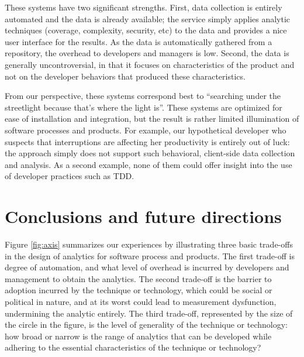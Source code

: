 \documentclass[]{article}
\begin{document}
These systems have two significant strengths.  First, data collection is entirely
automated and the data is already available; the service simply applies analytic
techniques (coverage, complexity, security, etc) to the data and provides a nice user
interface for the results. As the data is automatically gathered from a repository, the
overhead to developers and managers is low. Second, the data is generally
uncontroversial, in that it focuses on characteristics of the product and
not on the developer behaviors that produced these characteristics.

From our perspective, these systems correspond best to ``searching under the
streetlight because that's where the light is''.  These systems are optimized for ease of
installation and integration, but the result is rather limited illumination of software
processes and products.  For example, our hypothetical developer who suspects that
interruptions are affecting her productivity is entirely out of luck: the approach simply
does not support such behavioral, client-side data collection and analysis. As a second
example, none of them could offer insight into the use of developer practices such as TDD.

\section{Conclusions and future directions}

Figure \ref{fig:axis} summarizes our experiences by illustrating three basic trade-offs in
the design of analytics for software process and products.  The first trade-off is degree
of automation, and what level of overhead is incurred by developers and management to
obtain the analytics.  The second trade-off is the barrier to adoption incurred by the
technique or technology, which could be social or political in nature, and at its worst
could lead to measurement dysfunction, undermining the analytic entirely. The third
trade-off, represented by the size of the circle in the figure, is the level of generality
of the technique or technology: how broad or narrow is the range of analytics that can be
developed while adhering to the essential characteristics of the technique or technology?
\end{document}
